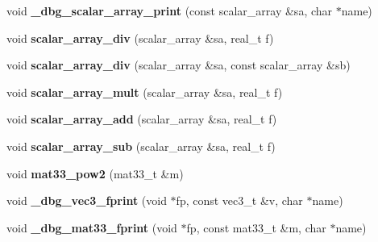 \begin{DoxyCompactItemize}
\item 
void {\bfseries \+\_\+dbg\+\_\+scalar\+\_\+array\+\_\+print} (const scalar\+\_\+array \&sa, char $\ast$name)\hypertarget{namespacekukadu_a3b8175643596f6670697724bfcbe05a4}{}\label{namespacekukadu_a3b8175643596f6670697724bfcbe05a4}

\item 
void {\bfseries scalar\+\_\+array\+\_\+div} (scalar\+\_\+array \&sa, real\+\_\+t f)\hypertarget{namespacekukadu_aded76c192975c615c13d05122f6ce38f}{}\label{namespacekukadu_aded76c192975c615c13d05122f6ce38f}

\item 
void {\bfseries scalar\+\_\+array\+\_\+div} (scalar\+\_\+array \&sa, const scalar\+\_\+array \&sb)\hypertarget{namespacekukadu_a83a70edbbd6707fcb4a5eb9601466f49}{}\label{namespacekukadu_a83a70edbbd6707fcb4a5eb9601466f49}

\item 
void {\bfseries scalar\+\_\+array\+\_\+mult} (scalar\+\_\+array \&sa, real\+\_\+t f)\hypertarget{namespacekukadu_acb8d808d309b7bc1f5a07897cf1a9085}{}\label{namespacekukadu_acb8d808d309b7bc1f5a07897cf1a9085}

\item 
void {\bfseries scalar\+\_\+array\+\_\+add} (scalar\+\_\+array \&sa, real\+\_\+t f)\hypertarget{namespacekukadu_a60f31aac3a844a757bd4874b9a5aef74}{}\label{namespacekukadu_a60f31aac3a844a757bd4874b9a5aef74}

\item 
void {\bfseries scalar\+\_\+array\+\_\+sub} (scalar\+\_\+array \&sa, real\+\_\+t f)\hypertarget{namespacekukadu_af080cbfcabc4c94d9eacaf7fcf7663cc}{}\label{namespacekukadu_af080cbfcabc4c94d9eacaf7fcf7663cc}

\item 
void {\bfseries mat33\+\_\+pow2} (mat33\+\_\+t \&m)\hypertarget{namespacekukadu_a4b1430357c13f56d3dd02bfcf1d17dde}{}\label{namespacekukadu_a4b1430357c13f56d3dd02bfcf1d17dde}

\item 
void {\bfseries \+\_\+dbg\+\_\+vec3\+\_\+fprint} (void $\ast$fp, const vec3\+\_\+t \&v, char $\ast$name)\hypertarget{namespacekukadu_ad8119e8c07da76d4deb269e0381105a6}{}\label{namespacekukadu_ad8119e8c07da76d4deb269e0381105a6}

\item 
void {\bfseries \+\_\+dbg\+\_\+mat33\+\_\+fprint} (void $\ast$fp, const mat33\+\_\+t \&m, char $\ast$name)\hypertarget{namespacekukadu_ad8e124fc2b1df9c77e26a631d5507c4a}{}\label{namespacekukadu_ad8e124fc2b1df9c77e26a631d5507c4a}


\end{DoxyCompactItemize}
